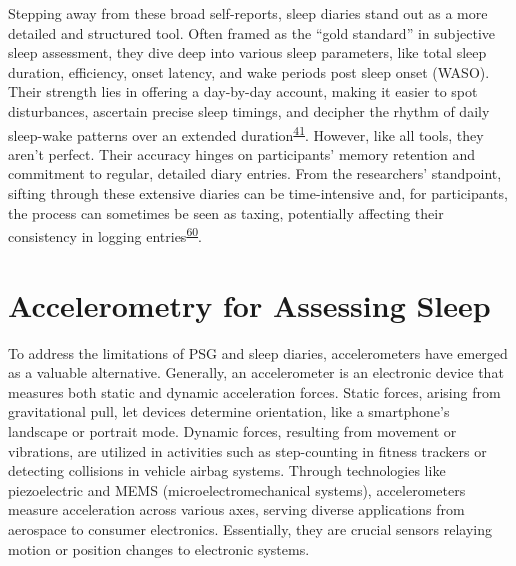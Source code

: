 \documentclass[
  10pt,
]{scrbook}
\begin{document}
Stepping away from these broad self-reports, sleep diaries stand out as
a more detailed and structured tool. Often framed as the ``gold
standard'' in subjective sleep assessment, they dive deep into various
sleep parameters, like total sleep duration, efficiency, onset latency,
and wake periods post sleep onset (WASO). Their strength lies in
offering a day-by-day account, making it easier to spot disturbances,
ascertain precise sleep timings, and decipher the rhythm of daily
sleep-wake patterns over an extended
duration\textsuperscript{\protect\hyperlink{ref-ibuxe1uxf1ez_2018}{41}}.
However, like all tools, they aren't perfect. Their accuracy hinges on
participants' memory retention and commitment to regular, detailed diary
entries. From the researchers' standpoint, sifting through these
extensive diaries can be time-intensive and, for participants, the
process can sometimes be seen as taxing, potentially affecting their
consistency in logging
entries\textsuperscript{\protect\hyperlink{ref-thurman_2018}{60}}.

\hypertarget{accelerometry-for-assessing-sleep}{%
\section{Accelerometry for Assessing
Sleep}\label{accelerometry-for-assessing-sleep}}

To address the limitations of PSG and sleep diaries, accelerometers have
emerged as a valuable alternative. Generally, an accelerometer is an
electronic device that measures both static and dynamic acceleration
forces. Static forces, arising from gravitational pull, let devices
determine orientation, like a smartphone's landscape or portrait mode.
Dynamic forces, resulting from movement or vibrations, are utilized in
activities such as step-counting in fitness trackers or detecting
collisions in vehicle airbag systems. Through technologies like
piezoelectric and MEMS (microelectromechanical systems), accelerometers
measure acceleration across various axes, serving diverse applications
from aerospace to consumer electronics. Essentially, they are crucial
sensors relaying motion or position changes to electronic systems.
\end{document}
